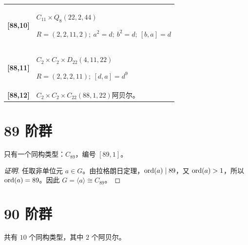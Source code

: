 \documentclass[UTF8,fontset=fandol,11pt,a4paper]{ctexart}
\begin{document}
\begin{longtable}{@{}p{17mm}>{\raggedright\arraybackslash}p{141mm}@{}}
\textbf{[88,10]} & $C_{11}\times Q_{8}$\quad $(22,2,44)$\par\(R=(2,2,11,2);\allowbreak\ a^{2}=d;\allowbreak\ b^{2}=d;\allowbreak\ [b,a]=d\)\\[3pt]

\textbf{[88,11]} & $C_{2}\times C_{2}\times D_{22}$\quad $(4,11,22)$\par\(R=(2,2,2,11);\allowbreak\ [d,a]=d^{9}\)\\[3pt]

\textbf{[88,12]} & $C_{2}\times C_{2}\times C_{22}$\quad $(88,1,22)$\quad 阿贝尔。\\[3pt]

\end{longtable}\endgroup

\section*{89 阶群}\label{order:89}

只有一个同构类型：$C_{89}$，编号 $[89,1]$。

\begin{proof}[证明]
任取非单位元 $a\in G$。由拉格朗日定理，$\operatorname{ord}(a)\mid 89$，又 $\operatorname{ord}(a)>1$，所以 $\operatorname{ord}(a)=89$。因此 $G=\langle a\rangle\cong C_{89}$。
\end{proof}

\section*{90 阶群}\label{order:90}

共有 $10$ 个同构类型，其中 $2$ 个阿贝尔。

\begingroup\small\setlength{\tabcolsep}{3pt}\renewcommand{\arraystretch}{1.12}
\end{document}
